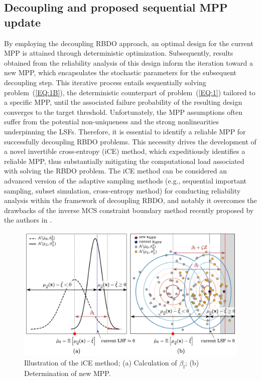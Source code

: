 \documentclass[preprint,3p]{elsarticle}
\begin{document}
\begin{linenumbers}
\subsection{Decoupling and proposed sequential MPP update}\label{SUBSEC:26}
By employing the decoupling RBDO approach, an optimal design for the current MPP is attained through deterministic optimization.
Subsequently, results obtained from the reliability analysis of this design inform the iteration toward a new MPP, which encapsulates the stochastic parameters for the subsequent decoupling step.
This iterative process entails sequentially solving problem~(\ref{EQ:1B}), the deterministic counterpart of problem~(\ref{EQ:1}) tailored to a specific MPP, until the associated failure probability of the resulting design converges to the target threshold.
Unfortunately, the MPP assumptions often suffer from the potential non-uniqueness and the strong nonlinearities underpinning the LSFs. Therefore, it is essential to identify a reliable MPP for successfully decoupling RBDO problems. 
This necessity drives the development of a novel invertible cross-entropy (iCE) method, which expeditiously identifies a reliable MPP, thus substantially mitigating the computational load associated with solving the RBDO problem. The iCE method can be considered an advanced version of the adaptive sampling methods (e.g., sequential important sampling, subset simulation, cross-entropy method) for conducting reliability analysis within the framework of decoupling RBDO, and notably it overcomes the drawbacks of the inverse MCS constraint boundary method recently proposed by the authors in \cite{VANHUYNH2023}.

\begin{figure}
    \begin{center}
        \includegraphics[scale=0.95]{Fig2.jpg}
    \end{center}
    \caption{Illustration of the iCE method; (a) Calculation of $\beta_\text{f}$; (b) Determination of new MPP.}
    \label{FIG:2}
\end{figure}


\end{linenumbers}
\end{document}
